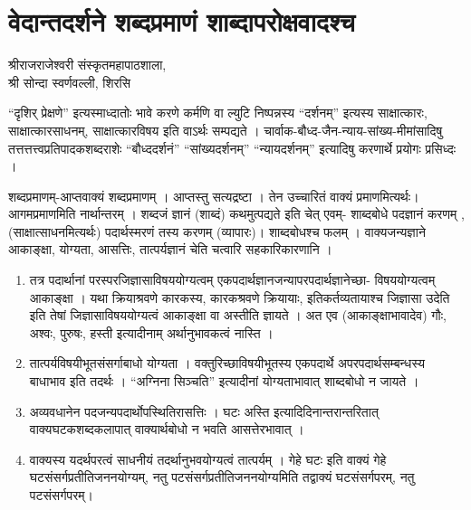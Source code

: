 {\fontsize{15}{17}\selectfont
\chapter{वेदान्तदर्शने शब्दप्रमाणं शाब्दापरोक्षवादश्च}

\begin{center}
\smallskip
 
श्रीराजराजेश्वरी संस्कृतमहापाठशाला,\\
श्री सोन्दा स्वर्णवल्ली, शिरसि
\addrule
\end{center}

“दृशिर् प्रेक्षणे” इत्यस्माध्दातोः भावे करणे कर्मणि वा ल्युटि निष्पन्नस्य “दर्शनम्” इत्यस्य साक्षात्कारः, साक्षात्कारसाधनम्, साक्षात्कारविषय इति वाऽर्थः सम्पद्यते । चार्वाक-बौध्द-जैन-न्याय-सांख्य-मीमांसादिषु तत्तत्तत्त्वप्रतिपादकशब्दराशेः “बौध्ददर्शनं” “सांख्यदर्शनम्” “न्यायदर्शनम्”  इत्यादिषु करणार्थे प्रयोगः प्रसिध्दः ।

शब्दप्रमाणम्-आप्तवाक्यं शब्दप्रमाणम् । आप्तस्तु सत्यद्रष्टा । तेन उच्चारितं वाक्यं प्रमाणमित्यर्थः। आगमप्रमाणमिति नार्थान्तरम् । शब्दजं ज्ञानं (शाब्दं) कथमुत्पद्यते इति चेत् एवम्- शाब्दबोधे पदज्ञानं करणम् , (साक्षात्साधनमित्यर्थः) पदार्थस्मरणं तस्य करणम् (व्यापारः)।  शाब्दबोधश्च फलम् । वाक्यजन्यज्ञाने आकाङ्क्षा, योग्यता, आसत्तिः, तात्पर्यज्ञानं चेति चत्वारि सहकारिकारणानि ।

\begin{enumerate}
\item तत्र पदार्थानां परस्परजिज्ञासाविषययोग्यत्वम् एकपदार्थज्ञानजन्यापरपदार्थज्ञानेच्छा- विषययोग्यत्वम् आकाङ्क्षा । यथा क्रियाश्रवणे कारकस्य, कारकश्रवणे क्रियायाः, इतिकर्तव्यतायाश्च जिज्ञासा उदेति इति तेषां जिज्ञासाविषययोग्यत्वं आकाङ्क्षा वा अस्तीति ज्ञायते । अत एव (आकाङ्क्षाभावादेव) गौः, अश्वः, पुरुषः, हस्ती इत्यादीनाम् अर्थानुभावकत्वं नास्ति ।
\item तात्पर्यविषयीभूतसंसर्गाबाधो योग्यता । वक्तुरिच्छाविषयीभूतस्य एकपदार्थे अपरपदार्थसम्बन्धस्य बाधाभाव इति तदर्थः । “अग्निना सिञ्चति” इत्यादीनां योग्यताभावात् शाब्दबोधो न जायते ।
\item अव्यवधानेन पदजन्यपदार्थोपस्थितिरासत्तिः । घटः अस्ति इत्यादिदिनान्तरान्तरितात् वाक्यघटकशब्दकलापात् वाक्यार्थबोधो न भवति आसत्तेरभावात् ।
\item वाक्यस्य यदर्थपरत्वं साधनीयं तदर्थानुभवयोग्यत्वं  तात्पर्यम् । गेहे घटः इति वाक्यं गेहे घटसंसर्गप्रतीतिजननयोग्यम्, नतु पटसंसर्गप्रतीतिजननयोग्यमिति तद्वाक्यं घटसंसर्गपरम्, नतु पटसंसर्गपरम्। 
\end{enumerate}

}
